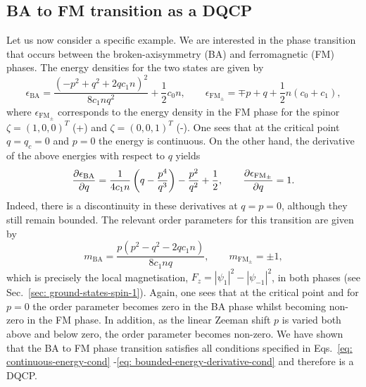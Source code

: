 \subsection{BA to FM transition as a DQCP}
Let us now consider a specific example.
We are interested in the phase transition that occurs between the
broken-axisymmetry (BA) and ferromagnetic (FM) phases.
The energy densities for the two states are given by~\cite{Kawaguchi2012}
\begin{equation}
    \epsilon_\mathrm{BA} = \frac{{(-p^2 + q^2 +2qc_1n)}^2}{8c_1nq^2}
    + \frac{1}{2}c_0n, \qquad
    \epsilon_\mathrm{FM_{\pm}} = \mp p + q + \frac{1}{2}n(c_0 + c_1),
\end{equation}
where \( \epsilon_\mathrm{FM_{\pm}} \) corresponds to the energy density in the
FM phase for the spinor \( \zeta = {(1, 0, 0)}^T \) (+) and
\( \zeta = {(0, 0, 1)}^T \) (-).
One sees that at the critical point \( q=q_c=0 \) and \( p=0 \) the energy is
continuous.
On the other hand, the derivative of the above energies with respect to \( q \)
yields
\begin{equation}
    \pdv{\epsilon_\mathrm{BA}}{q} =
    \frac{1}{4c_1n}\left(q - \frac{p^4}{q^3}\right) - \frac{p^2}{q^2}
    + \frac{1}{2},
    \qquad
    \pdv{\epsilon_\mathrm{FM_{\pm}}}{q} = 1.
\end{equation}
Indeed, there is a discontinuity in these derivatives at \( q=p=0 \), although
they still remain bounded.
The relevant order parameters for this transition are given by
\begin{equation}
    m_\mathrm{BA} = \frac{p(p^2 - q^2 - 2qc_1n)}{8c_1nq},
    \qquad
    m_{\mathrm{FM}_{\pm}} = \pm 1,
\end{equation}
which is precisely the local magnetisation, \(F_z = |\psi_1|^2
- |\psi_{-1}|^2\), in both phases (see Sec.~\ref{sec: ground-states-spin-1}).
Again, one sees that at the critical point and for \( p=0 \) the order parameter
becomes zero in the BA phase whilst becoming non-zero in the FM phase.
In addition, as the linear Zeeman shift \( p \) is varied both above and below
zero, the order parameter becomes non-zero.
We have shown that the BA to FM phase transition satisfies all conditions
specified in Eqs.~\eqref{eq: continuous-energy-cond}
-\eqref{eq: bounded-energy-derivative-cond}
and therefore is a DQCP\@.

